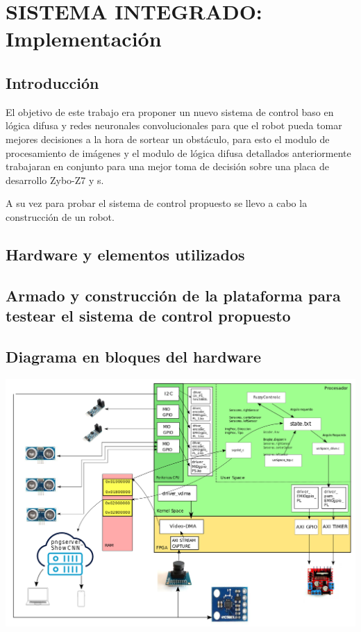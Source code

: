 \section{SISTEMA INTEGRADO: Implementación}

\subsection{Introducción}

El objetivo de este trabajo era proponer un nuevo sistema de control baso en lógica difusa y redes neuronales convolucionales para que el robot pueda tomar mejores decisiones a la hora de sortear un obstáculo, para esto el modulo de procesamiento de imágenes y el modulo de lógica difusa detallados anteriormente trabajaran en conjunto para una mejor toma de decisión sobre una placa de desarrollo Zybo-Z7 y s.\par
A su vez para probar el sistema de control propuesto se llevo a cabo la construcción de un robot.

\subsection{Hardware y elementos utilizados}



\subsection{Armado y construcción de la plataforma para testear el sistema de control propuesto}



\subsection{Diagrama en bloques del hardware}

\begin{center}
    \includegraphics[scale=0.3]{Tesis/Capitulos/05_CAPITULO_3/BlockDiagram.png}
\end{center}


